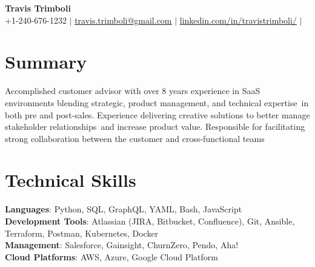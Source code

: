 \documentclass[letterpaper,11pt]{article}
\begin{document}

\begin{center}
  \textbf{\Huge \bfseries Travis Trimboli} \\ \vspace{1pt}
  \small +1-240-676-1232 $|$ \href{mailto:travis.trimboli@gmail.com}{\underline{travis.trimboli@gmail.com}} $|$
  \href{https://www.linkedin.com/in/travistrimboli/}{\underline{linkedin.com/in/travistrimboli/}} $|$
\end{center}

\section*{Summary}
Accomplished customer advisor with over 8 years experience in SaaS environments blending strategic, product management, and technical expertise\
in both pre and post-sales. Experience delivering creative solutions to better manage stakeholder relationships\
and increase product value. Responsible for facilitating strong collaboration between the customer and cross-functional teams

\section{Technical Skills}
\begin{itemize}[leftmargin=0.15in, label={}]
  \small{\item{
        \textbf{Languages}{: Python, SQL, GraphQL, YAML, Bash, JavaScript} \\
        \textbf{Development Tools}{: Atlassian (JIRA, Bitbucket, Confluence), Git, Ansible, Terraform, Postman, Kubernetes, Docker} \\
        \textbf{Management}{: Salesforce, Gainsight, ChurnZero, Pendo, Aha!} \\
        \textbf{Cloud Platforms}{: AWS, Azure, Google Cloud Platform}
        }}
\end{itemize}

\end{document}
